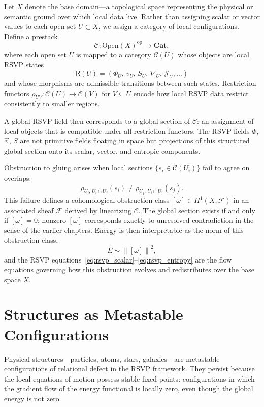 \documentclass[12pt,a4paper,openany]{book}
\theoremstyle{plain}
\theoremstyle{definition}
\theoremstyle{remark}
\newcommand{\Energy}{E}
\newcommand{\Entropy}{S}
\newcommand{\scalar}{\Phi}
\newcommand{\kvec}{\vec{v}}
\newcommand{\norm}[1]{\left\|#1\right\|}
\begin{document}
Let $X$ denote the base domain---a topological space representing the physical or semantic ground over which local data live. Rather than assigning scalar or vector values to each open set $U \subset X$, we assign a category of local configurations. Define a prestack
\[
\mathcal{C} : \mathrm{Open}(X)^{\mathrm{op}} \to \mathbf{Cat},
\]
where each open set $U$ is mapped to a category $\mathcal{C}(U)$ whose objects are local RSVP states
\[
\mathsf{R}(U) = (\Phi_U,\, v_U,\, S_U,\, \nabla_U,\, \mathcal{J}_U, \dots)
\]
and whose morphisms are admissible transitions between such states. Restriction functors $\rho_{UV} : \mathcal{C}(U) \to \mathcal{C}(V)$ for $V \subseteq U$ encode how local RSVP data restrict consistently to smaller regions.

A global RSVP field then corresponds to a global section of $\mathcal{C}$: an assignment of local objects that is compatible under all restriction functors. The RSVP fields $\scalar$, $\kvec$, $\Entropy$ are not primitive fields floating in space but projections of this structured global section onto its scalar, vector, and entropic components.

Obstruction to gluing arises when local sections $\{s_i \in \mathcal{C}(U_i)\}$ fail to agree on overlaps:
\[
\rho_{U_i,\, U_i \cap U_j}(s_i) \neq \rho_{U_j,\, U_i \cap U_j}(s_j).
\]
This failure defines a cohomological obstruction class $[\omega] \in H^1(X, \mathcal{F})$ in an associated sheaf $\mathcal{F}$ derived by linearizing $\mathcal{C}$. The global section exists if and only if $[\omega] = 0$; nonzero $[\omega]$ corresponds exactly to unresolved contradiction in the sense of the earlier chapters. Energy is then interpretable as the norm of this obstruction class,
\[
\Energy \sim \norm{[\omega]}^2,
\]
and the RSVP equations~\eqref{eq:rsvp_scalar}--\eqref{eq:rsvp_entropy} are the flow equations governing how this obstruction evolves and redistributes over the base space $X$.

\section{Structures as Metastable Configurations}

Physical structures---particles, atoms, stars, galaxies---are metastable configurations of relational defect in the RSVP framework. They persist because the local equations of motion possess stable fixed points: configurations in which the gradient flow of the energy functional is locally zero, even though the global energy is not zero.
\end{document}
